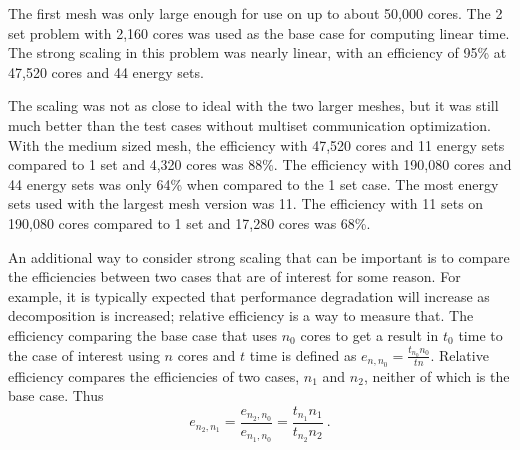 The first mesh was only large enough for use on up to about 50,000 cores. The 2 set problem with 2,160 cores was used as the base case for computing linear time. The strong scaling in this problem was nearly linear, with an efficiency of 95\% at 47,520 cores and 44 energy sets. 

The scaling was not as close to ideal with the two larger meshes, but it was still much better than the test cases without multiset communication optimization. With the medium sized mesh, the efficiency with 47,520 cores and 11 energy sets compared to 1 set and 4,320 cores was 88\%. The efficiency with 190,080 cores and 44 energy sets was only 64\% when compared to the 1 set case. The most energy sets used with the largest mesh version was 11. The efficiency with 11 sets on 190,080 cores compared to 1 set and 17,280 cores was 68\%. 

An additional way to consider strong scaling that can be important is to compare the efficiencies between two cases that are of interest for some reason. For example, it is typically expected that performance degradation will increase as decomposition is increased; relative efficiency is a way to measure that. The efficiency comparing the base case that uses $n_{0}$ cores to get a result in $t_{0}$ time to the case of interest using $n$ cores and $t$ time is defined as $e_{n,n_{0}} = \frac{t_{n_{0}}n_{0}}{tn}$. Relative efficiency compares the efficiencies of two cases, $n_{1}$ and $n_{2}$, neither of which is the base case. Thus
\begin{equation}
  e_{n_{2},n_{1}} = \frac{e_{n_{2},n_{0}}}{e_{n_{1},n_{0}}} = \frac{t_{n_{1}}n_{1}}{t_{n_{2}}n_{2}} \:.
  \label{eq:relEfficiency}
\end{equation}


